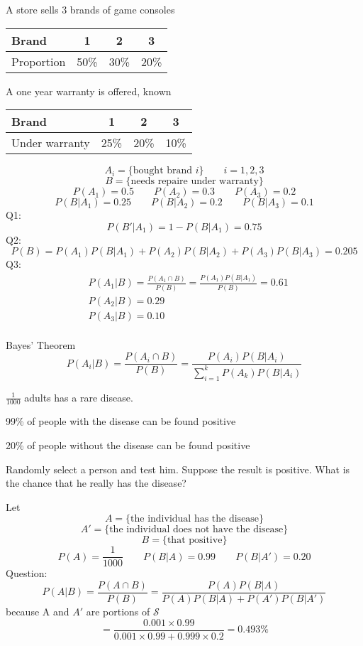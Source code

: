 \begin{exmp}
  A store sells 3 brands of game consoles

  \vspace{4mm}
\begin{center}
  \begin{tabular}{l|ccc}
    \hline
    Brand & 1 & 2 & 3 \\
    \hline
    Proportion & 50\% & 30\% & 20\%\\
    \hline
  \end{tabular}  
\end{center}


A one year warranty is offered, known 

\begin{center}
    \begin{tabular}{l|ccc}
    \hline
    Brand & 1 & 2 & 3 \\
    \hline
    Under warranty & 25\% & 20\% & 10\%\\
    \hline
  \end{tabular}
\end{center}
  \[A_i=\{\text{bought brand }i\} \qquad i=1,2,3\]
  \[B=\{\text{needs repaire under warranty}\} \]
  \[P(A_1)=0.5 \qquad P(A_2)=0.3 \qquad P(A_3)=0.2\]
  \[P(B|A_1)=0.25 \qquad P(B|A_2)=0.2 \qquad P(B|A_3)=0.1\]
  Q1:\[P(B'|A_1)=1-P(B|A_1)=0.75\]
  Q2:\[P(B)=P(A_1)P(B|A_1)+P(A_2)P(B|A_2)+P(A_3)P(B|A_3)=0.205\]
  Q3:\begin{align*}
  &P(A_1|B)=\frac{P(A_1 \cap B)}{P(B)}=\frac{P(A_1)P(B|A_1)}{P(B)}=0.61\\
  &P(A_2|B)=0.29 \\
  &P(A_3|B)=0.10\\
  \end{align*}
\end{exmp}

\begin{theo}
  Bayes' Theorem
  \[P(A_i|B)=\frac{P(A_i \cap B)}{P(B)}=\frac{P(A_i)P(B|A_i)}{\sum_{i=1}^k P(A_k)P(B|A_i)}    \]
\end{theo}

\begin{exmp}
$\frac{1}{1000}$ adults has a rare disease.

99\% of people with the disease can be found positive

20\% of people without the disease can be found positive

Randomly select a person and test him. Suppose the result is positive. What is the chance that he really has the disease? 

Let
\[	A=\{\text{the individual has the disease} \}		\]
\[	A'=\{\text{the individual does not have the disease} \}		\]
\[	B=\{\text{that positive} \}		\]
\[	P(A)=\frac{1}{1000} \qquad P(B|A)=0.99 \qquad P(B|A')=0.20	\]
Question:
\[	P(A|B)=\frac{P(A \cap B)}{P(B)}=\frac{P(A)P(B|A)}{P(A)P(B|A)+P(A')P(B|A')}		\]
because A and $A'$ are portions of $\mathcal{S}$
\[	=\frac{0.001\times 0.99}{0.001\times 0.99+ 0.999\times 0.2}=0.493\%		\]
\end{exmp}
